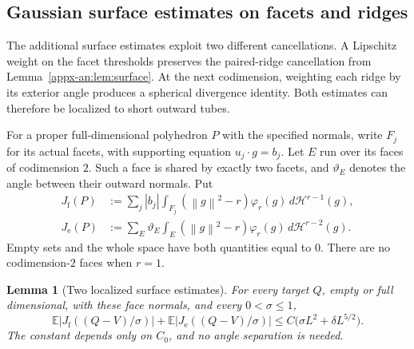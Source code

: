 \documentclass[11pt,letterpaper]{article}
\newtheorem{lemma}{Lemma}
\theoremstyle{remark}
\newcommand{\E}{\mathbb E}
\newcommand{\norm}[1]{\left\lVert#1\right\rVert}
\newcommand{\dd}{\,d}
\begin{document}
\subsection{Gaussian surface estimates on facets and ridges}
The additional surface estimates exploit two different cancellations.
A Lipschitz weight on the facet thresholds preserves the paired-ridge
cancellation from Lemma~\ref{appx-an:lem:surface}. At the next codimension, weighting
each ridge by its exterior angle produces a spherical divergence identity.
Both estimates can therefore be localized to short outward tubes.

For a proper full-dimensional polyhedron $P$ with the specified normals,
write $F_j$ for its actual facets, with supporting equation
$u_j\cdot g=b_j$. Let $E$ run over its faces of codimension $2$.
Such a face is shared by exactly two facets, and $\vartheta_E$ denotes
the angle between their outward normals. Put
\begin{align}
 J_{\mathrm f}(P)&:=\sum_j |b_j|
   \int_{F_j}(\norm g^2-r)\varphi_r(g)\dd\mathcal H^{r-1}(g),
 \label{h3:eq:Jf}\\
 J_{\mathrm e}(P)&:=\sum_E \vartheta_E
   \int_E(\norm g^2-r)\varphi_r(g)\dd\mathcal H^{r-2}(g).
 \label{h3:eq:Je}
\end{align}
Empty sets and the whole space have both quantities equal to $0$.
There are no codimension-$2$ faces when $r=1$.

\begin{lemma}[Two localized surface estimates]\label{h3:lem:surfaces}
For every target $Q$, empty or full dimensional, with these face normals,
and every $0<\sigma\le1$,
\begin{equation}
 \E\bigl|J_{\mathrm f}((Q-V)/\sigma)\bigr|
 +\E\bigl|J_{\mathrm e}((Q-V)/\sigma)\bigr|
 \le C\bigl(\sigma L^2+\delta L^{5/2}\bigr).
 \label{h3:eq:surface-bounds}
\end{equation}
The constant depends only on $C_0$, and no angle separation is needed.
\end{lemma}
\end{document}
